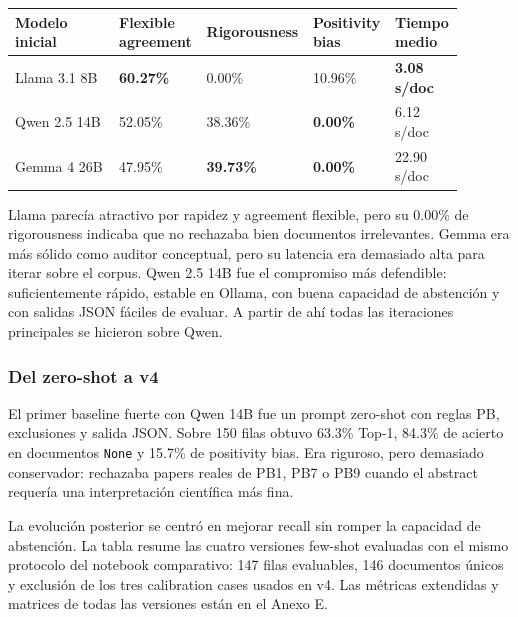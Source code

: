 \begin{center}
\scriptsize
\setlength{\tabcolsep}{5pt}
\renewcommand{\arraystretch}{1.15}
\begin{tabular}{p{0.23\linewidth}p{0.17\linewidth}p{0.17\linewidth}p{0.17\linewidth}p{0.15\linewidth}}
\toprule
Modelo inicial & Flexible agreement & Rigorousness & Positivity bias & Tiempo medio \\
\midrule
Llama 3.1 8B & \textbf{60.27\%} & 0.00\% & 10.96\% & \textbf{3.08 s/doc} \\
Qwen 2.5 14B & 52.05\% & 38.36\% & \textbf{0.00\%} & 6.12 s/doc \\
Gemma 4 26B & 47.95\% & \textbf{39.73\%} & \textbf{0.00\%} & 22.90 s/doc \\
\bottomrule
\end{tabular}
\end{center}

Llama parecía atractivo por rapidez y agreement flexible, pero su 0.00\% de rigorousness indicaba que no rechazaba bien documentos irrelevantes. Gemma era más sólido como auditor conceptual, pero su latencia era demasiado alta para iterar sobre el corpus. Qwen 2.5 14B fue el compromiso más defendible: suficientemente rápido, estable en Ollama, con buena capacidad de abstención y con salidas JSON fáciles de evaluar. A partir de ahí todas las iteraciones principales se hicieron sobre Qwen.

\subsubsection{Del zero-shot a v4}

El primer baseline fuerte con Qwen 14B fue un prompt zero-shot con reglas PB, exclusiones y salida JSON. Sobre 150 filas obtuvo 63.3\% Top-1, 84.3\% de acierto en documentos \texttt{None} y 15.7\% de positivity bias. Era riguroso, pero demasiado conservador: rechazaba papers reales de PB1, PB7 o PB9 cuando el abstract requería una interpretación científica más fina.

La evolución posterior se centró en mejorar recall sin romper la capacidad de abstención. La tabla resume las cuatro versiones few-shot evaluadas con el mismo protocolo del notebook comparativo: 147 filas evaluables, 146 documentos únicos y exclusión de los tres calibration cases usados en v4. Las métricas extendidas y matrices de todas las versiones están en el Anexo E.


